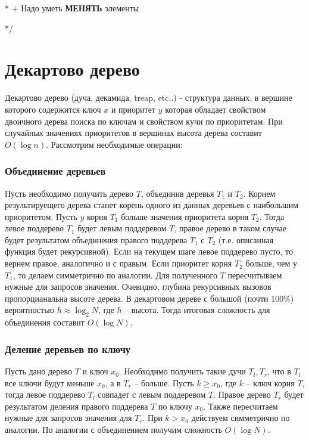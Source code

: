   * + Надо уметь \textbf{МЕНЯТЬ} элементы\
  
  */\
  
\chapter{Декартово дерево}
Декартово дерево (дуча, декамида, treap, etc..) - структура данных, в вершине которого содержится ключ $x$ и приоритет $y$ которая обладает свойством двоичного дерева поиска по ключам и свойством кучи по приоритетам. При случайных значениях приоритетов в вершинах высота дерева составит $O(\log{n})$. \newline
Рассмотрим необходимые операции:\newline

\subsection*{Объединение деревьев}
Пусть необходимо получить дерево $T$, объединив деревья $T_1$ и $T_2$. Корнем результируещего дерева станет корень одного из данных деревьев с наибольшим приоритетом. Пусть $y$ корня $T_1$ больше значения приоритета корня $T_2$. Тогда левое поддерево $T_1$ будет левым поддеревом $T$, правое дерево в таком случае будет результатом объединения правого поддерева $T_1$ с $T_2$ (т.е. описанная функция будет рекурсивной). Если на текущем шаге левое поддерево пусто, то вернем правое, аналогично и с правым. Если приоритет корня $T_2$ больше, чем у $T_1$, то делаем симметрично по аналогии. Для полученного $T$ пересчитываем нужные для запросов значения. Очевидно, глубина рекурсивных вызовов пропорцианальна высоте дерева. В декартовом дереве с большой (почти 100\%) вероятностью $h\approx\log_2{N}$, где $h$ -- высота. Тогда итоговая сложность для объединения составит $O(\log{N})$.

\subsection*{Деление деревьев по ключу}
Пусть дано дерево $T$ и ключ $x_0$. Необходимо получить такие дучи $T_l, T_r$, что в $T_l$ все ключи будут меньше $x_0$, а в $T_r$ -- больше. Пусть $k\geq x_0$, где $k$ -- ключ корня $T$, тогда левое поддерево $T_l$ совпадет с левым поддеревом $T$. Правое дерево $T_r$ будет результатом деления правого поддерева $T$ по ключу $x_0$. Также пересчитаем нужные для запросов значения для $T_r$. При $k>x_0$ действуем симметрично по аналогии. По аналогии с объединением получим сложность $O(\log{N})$.

